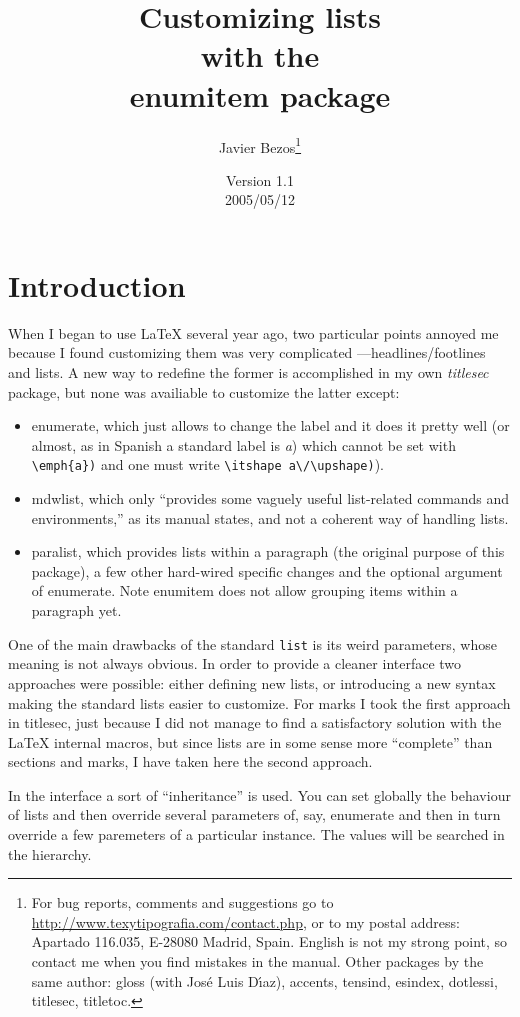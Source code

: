\documentclass{article}
\title{Customizing lists\\with the\\\textsf{enumitem} package}
\author{Javier Bezos\footnote{For bug reports, comments and
suggestions go to \href{http://www.texytipografia.com/contact.php}%
{http://www.texytipografia.com/contact.php}, or
to my postal address: Apartado 116.035, E-28080 Madrid, Spain.
English is not my strong point, so contact me when you
find mistakes in the manual. Other packages by the same author:
\textsf{gloss} (with Jos\'e Luis D\'{\i}az), \textsf{accents,
tensind, esindex, dotlessi, titlesec, titletoc}.}}
\date{Version 1.1\\2005/05/12}
\begin{document}
\maketitle

\section{Introduction}

When I began to use \LaTeX{} several year ago, two particular points
annoyed me because I found customizing them was very complicated
---headlines/footlines and lists.  A new way to redefine the former is
accomplished in my own \textit{titlesec} package, but none was
availiable to customize the latter except:
\begin{itemize}
\item \textsf{enumerate}, which just allows to change the label and
it does it pretty well (or almost, as in Spanish a standard label is
\textit{a}) which cannot be set with \verb|\emph{a})| and one must
write \verb|\itshape a\/\upshape)|).

\item \textsf{mdwlist}, which only ``provides some vaguely useful
list-related commands and environments,'' as its manual states,
and not a coherent way of handling lists.

\item \textsf{paralist}, which provides lists within a paragraph (the
original purpose of this package), a few other hard-wired
specific changes and the optional argument of \textsf{enumerate}.
Note \textsf{enumitem} does not allow grouping items within
a paragraph yet.
\end{itemize}

One of the main drawbacks of the standard \verb|list| is its weird
parameters, whose meaning is not always obvious.  In order to provide
a cleaner interface two approaches were possible: either defining new
lists, or introducing a new syntax making the standard lists easier to
customize.  For marks I took the first approach in titlesec, just
because I did not manage to find a satisfactory solution with the
\LaTeX{} internal macros, but since lists are in some sense more
``complete'' than sections and marks, I have taken here the second
approach.

In the interface a sort of ``inheritance'' is used. You can
set globally the behaviour of lists and then override several
parameters of, say, enumerate and then in turn override
a few paremeters of a particular instance. The values will
be searched in the hierarchy.
\end{document}
